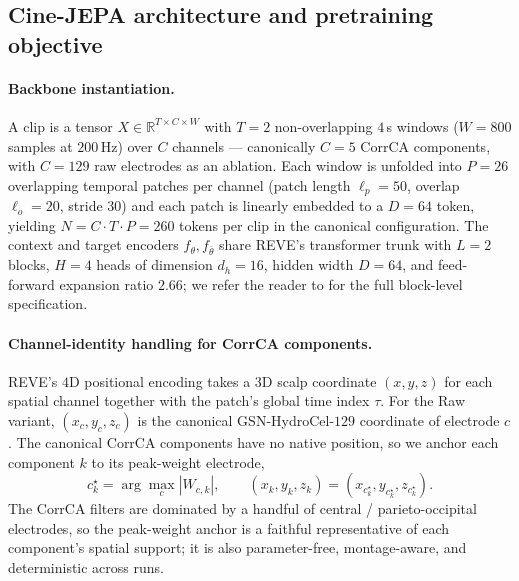 \subsection{Cine-JEPA architecture and pretraining objective}
\label{sec:method:model}

\paragraph{Backbone instantiation.}
A clip is a tensor $X \in \mathbb{R}^{T \times C \times W}$ with
$T = 2$ non-overlapping $4$\,s windows ($W = 800$ samples at
$200$\,Hz) over $C$ channels — canonically $C = 5$ CorrCA components,
with $C = 129$ raw electrodes as an ablation. Each window is unfolded
into $P = 26$ overlapping temporal patches per channel (patch length
$\ell_p = 50$, overlap $\ell_o = 20$, stride $30$) and each patch is
linearly embedded to a $D = 64$ token, yielding $N = C \cdot T \cdot
P = 260$ tokens per clip in the canonical configuration. The context
and target encoders $f_\theta, f_{\bar\theta}$ share REVE's
transformer trunk with $L = 2$ blocks, $H = 4$ heads of dimension
$d_h = 16$, hidden width $D = 64$, and feed-forward expansion ratio
$2.66$; we refer the reader to \citep{elouahidi2025reve} for the full
block-level specification.

\paragraph{Channel-identity handling for CorrCA components.}
REVE's $4$D positional encoding takes a $3$D scalp coordinate
$(x, y, z)$ for each spatial channel together with the patch's global
time index $\tau$. For the Raw variant, $(x_c, y_c, z_c)$ is the
canonical GSN-HydroCel-$129$ coordinate of electrode $c$. The
canonical CorrCA components have no native position, so we anchor
each component $k$ to its peak-weight electrode,
\begin{equation}
  c^\star_k = \arg\max_{c} |W_{c, k}|,
  \qquad
  (x_k, y_k, z_k) = (x_{c^\star_k}, y_{c^\star_k}, z_{c^\star_k}).
\end{equation}
The CorrCA filters are dominated by a handful of central /
parieto-occipital electrodes, so the peak-weight anchor is a faithful
representative of each component's spatial support; it is also
parameter-free, montage-aware, and deterministic across runs.

